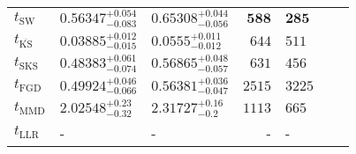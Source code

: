 \begin{tabular}{l|llr|llr}
	\midrule
	$t_{\mathrm{SW}}$ & $0.56347_{-0.083}^{+0.054}$ & $0.65308_{-0.056}^{+0.044}$ & ${\mathbf{588}}$ & ${\mathbf{285}}$ \\
	$t_{\overline{\mathrm{KS}}}$ & ${\mathbf{0.03885_{-0.015}^{+0.012}}}$ & ${\mathbf{0.0555_{-0.012}^{+0.011}}}$ & $644$ & $511$ \\
	$t_{\mathrm{SKS}}$ & $0.48383_{-0.074}^{+0.061}$ & $0.56865_{-0.057}^{+0.048}$ & $631$ & $456$ \\
	$t_{\mathrm{FGD}}$ & $0.49924_{-0.066}^{+0.046}$ & $0.56381_{-0.047}^{+0.036}$ & $2515$ & $3225$ \\
	$t_{\mathrm{MMD}}$ & $2.02548_{-0.32}^{+0.23}$ & $2.31727_{-0.2}^{+0.16}$ & $1113$ & $665$ \\
	$t_{\mathrm{LLR}}$ & - & - & - & - \\
	\bottomrule
\end{tabular}